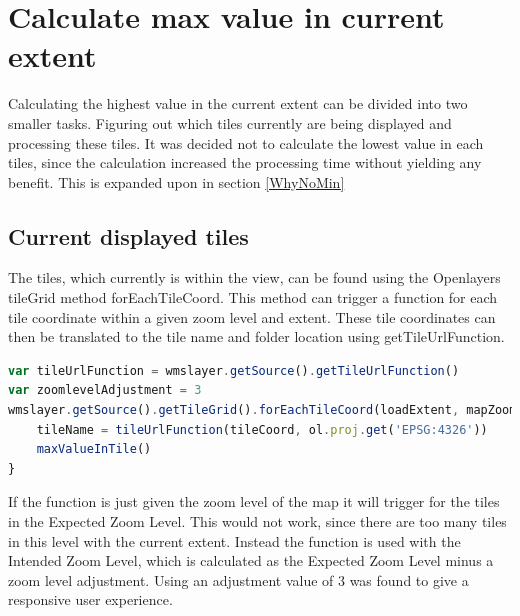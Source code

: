 \section{Calculate max value in current extent}
Calculating the highest value in the current extent can be divided into two smaller tasks. Figuring out which tiles currently are being displayed and processing these tiles. It was decided not to calculate the lowest value in each tiles, since the calculation increased the processing time without yielding any benefit. This is expanded upon in section \ref{WhyNoMin}

\subsection{Current displayed tiles}\label{CurrentDisplayedTiles}

The tiles, which currently is within the view, can be found using the Openlayers tileGrid method forEachTileCoord. This method can trigger a function for each tile coordinate within a given zoom level and extent. 
\citep{forEachTileCoord}
These tile coordinates can then be translated to the tile name and folder location using getTileUrlFunction.
\begin{lstlisting}[language=JavaScript, caption={}, label= VoresJS,escapechar=|]
var tileUrlFunction = wmslayer.getSource().getTileUrlFunction()
var zoomlevelAdjustment = 3
wmslayer.getSource().getTileGrid().forEachTileCoord(loadExtent, mapZoom - zoomlevelAdjustment, function(tileCoord) {
	tileName = tileUrlFunction(tileCoord, ol.proj.get('EPSG:4326'))
	maxValueInTile()
}
\end{lstlisting}
If the function is just given the zoom level of the map it will trigger for the tiles in the Expected Zoom Level. This would not work, since there are too many tiles in this level with the current extent. Instead the function is used with the Intended Zoom Level, which is calculated as the Expected Zoom Level minus a zoom level adjustment. Using an adjustment value of 3 was found to give a responsive user experience.


